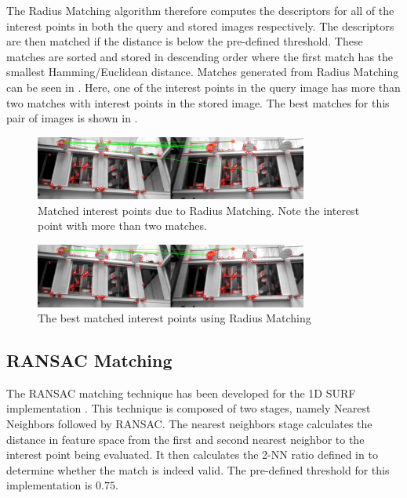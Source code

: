 The Radius Matching algorithm therefore computes the descriptors for all of the interest points in both the query and stored images respectively. The descriptors are then matched if the distance is below the pre-defined threshold. These matches are sorted and stored in descending order where the first match has the smallest Hamming/Euclidean distance. Matches generated from Radius Matching can be seen in . Here, one of the interest points in the query image has more than two matches with interest points in the stored image. The best matches for this pair of images is shown in .\\ 


 \begin{figure}[h!] 
  \centering
    \includegraphics[width=0.8\textwidth]{../Drawings/Matching/feature_matching/dataset1_without_validation_radius.jpg}
    \caption{Matched interest points due to Radius Matching. Note the interest point with more than two matches.}
    \label{fig:radius_match}
\end{figure}

 \begin{figure}[h!] 
  \centering
    \includegraphics[width=0.8\textwidth]{../Drawings/Matching/feature_matching/dataset1_without_validation_radius_best.jpg}
    \caption{The best matched interest points using Radius Matching}
    \label{fig:radius_best_match}
\end{figure}

\subsection{RANSAC Matching}
\label{sec:ransacMatching}
The RANSAC matching technique has been developed for the 1D SURF implementation \cite{Anderson}. This technique is composed of two stages, namely Nearest Neighbors followed by RANSAC. The nearest neighbors stage calculates the distance in feature space from the first and second nearest neighbor to the interest point being evaluated. It then calculates the 2-NN ratio defined in  to determine whether the match is indeed valid. The pre-defined threshold for this implementation is $0.75$.\\

